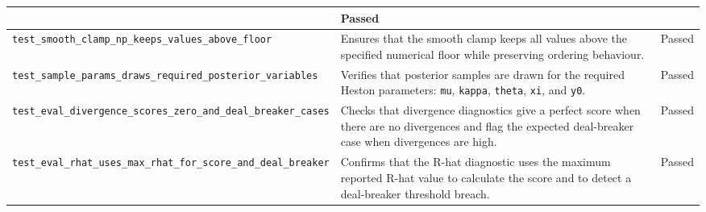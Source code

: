 \documentclass[11pt]{report}
\begin{document}
{\begin{longtable}{|L{0.30\textwidth}|L{0.45\textwidth}|L{0.10\textwidth}|}
& Passed \\
\hline
\texttt{test\_\allowbreak smooth\_\allowbreak clamp\_\allowbreak np\_\allowbreak keeps\_\allowbreak values\_\allowbreak above\_\allowbreak floor}
& Ensures that the smooth clamp keeps all values above the specified numerical floor while preserving ordering behaviour.
& Passed \\
\hline
\texttt{test\_\allowbreak sample\_\allowbreak params\_\allowbreak draws\_\allowbreak required\_\allowbreak posterior\_\allowbreak variables}
& Verifies that posterior samples are drawn for the required Heston parameters: \texttt{mu}, \texttt{kappa}, \texttt{theta}, \texttt{xi}, and \texttt{y0}.
& Passed \\
\hline
\texttt{test\_\allowbreak eval\_\allowbreak divergence\_\allowbreak scores\_\allowbreak zero\_\allowbreak and\_\allowbreak deal\_\allowbreak breaker\_\allowbreak cases}
& Checks that divergence diagnostics give a perfect score when there are no divergences and flag the expected deal-breaker case when divergences are high.
& Passed \\
\hline
\texttt{test\_\allowbreak eval\_\allowbreak rhat\_\allowbreak uses\_\allowbreak max\_\allowbreak rhat\_\allowbreak for\_\allowbreak score\_\allowbreak and\_\allowbreak deal\_\allowbreak breaker}
& Confirms that the R-hat diagnostic uses the maximum reported R-hat value to calculate the score and to detect a deal-breaker threshold breach.
& Passed \\
\hline
\end{longtable}
}


\end{document}
